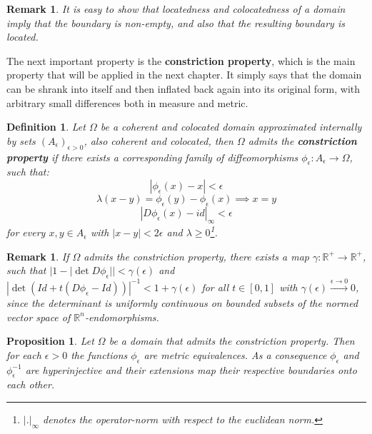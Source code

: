 \documentclass[11pt,a4paper,leqno]{report}
\newtheorem{proposition}{Proposition}[chapter]
\newtheorem{definition}[theorem]{Definition}
\newtheorem{remark}[theorem]{Remark}
\numberwithin{equation}{chapter}
\begin{document}
\begin{remark} It is easy to show that locatedness and colocatedness of a domain imply that the boundary is non-empty, and also that the resulting boundary is located.\end{remark}
The next important property is the \textbf{constriction property}, which is the main property that will be applied in the next chapter. It simply says that the domain can be shrank into itself and then inflated back again into its original form, with arbitrary small differences both in measure and metric.
\begin{definition}
Let $\Omega$ be a coherent and colocated domain approximated internally by sets $(A_\epsilon)_{\epsilon>0}$, also coherent and colocated, then $\Omega$ admits the \textbf{constriction property} if there exists a corresponding family of diffeomorphisms $\phi_\epsilon:A_\epsilon\rightarrow \Omega$, such that:
\begin{equation} |\phi_\epsilon(x)-x|<\epsilon\end{equation}
\begin{equation} \lambda(x-y)=\phi_\epsilon(y)-\phi_\epsilon(x)\implies x=y\end{equation}
\begin{equation} |D\phi_\epsilon(x)-id|_\infty<\epsilon\end{equation}
for every $x,y\in A_\epsilon$ with $|x-y|<2\epsilon$ and $\lambda\geq 0$\footnote{$|.|_\infty$ denotes the operator-norm with respect to the euclidean norm.}.
\end{definition}
\begin{remark}If $\Omega$ admits the constriction property, there exists a map $\gamma:\mathbb{R}^+\rightarrow \mathbb{R}^+$, such that $|1-|\det{D\phi_\epsilon}||<\gamma(\epsilon)$ and $|\det(Id+t(D\phi_\epsilon-Id))|^{-1}<1+\gamma(\epsilon)$ for all $t\in[0,1]$ with $\gamma(\epsilon)\overset{\epsilon\rightarrow 0}{\rightarrow}0$, since the determinant is uniformly continuous on bounded subsets of the normed vector space of $\mathbb{R}^n$-endomorphisms.
\end{remark}
\begin{proposition} Let $\Omega$ be a domain that admits the constriction property. Then for each $\epsilon>0$ the functions $\phi_\epsilon$ are metric equivalences. As a consequence $\phi_\epsilon$ and $\phi_\epsilon^{-1}$ are hyperinjective and their extensions map their respective boundaries onto each other.
\end{proposition}
\end{document}
